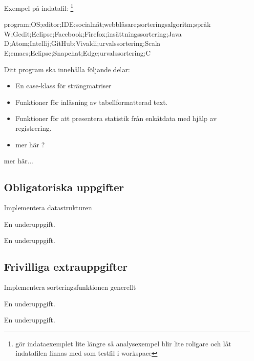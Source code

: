 Exempel på indatafil: \footnote{\TODO gör indataexemplet lite längre så analysexempel blir lite roligare och låt indatafilen finnas med som testfil i workspace}
\begin{CodeSmall}[language=, ]
program;OS;editor;IDE;socialnät;webbläsare;sorteringsalgoritm;språk
W;Gedit;Eclipse;Facebook;Firefox;insättningssortering;Java
D;Atom;Intellij;GitHub;Vivaldi;urvalssortering;Scala
E;emacs;Eclipse;Snapchat;Edge;urvalssortering;C
\end{CodeSmall}

Ditt program ska innehålla följande delar:
\begin{itemize}
\item En case-klass för strängmatriser 
\item Funktioner för inläsning av tabellformatterad text.
\item Funktioner för att presentera statistik från enkätdata med hjälp av registrering.
\item \TODO mer här ?
\end{itemize}

\TODO mer här...

\subsection{Obligatoriska uppgifter}

\Task Implementera datastrukturen

\Subtask En underuppgift.

\Subtask En underuppgift.

\subsection{Frivilliga extrauppgifter}

\Task Implementera sorteringsfunktionen generellt

\Subtask En underuppgift.

\Subtask En underuppgift.
    
